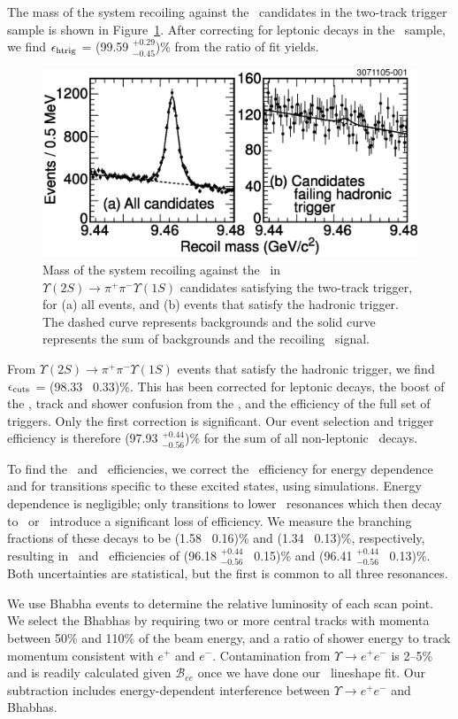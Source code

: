 \documentclass[aps,prd,preprint,superscriptaddress,tightenlines,nofootinbib]{revtex4}
\begin{document}
The mass of the system recoiling against the \pipi\ candidates in the
two-track trigger sample is shown in Figure~\ref{fig:cascades}.  After
correcting for leptonic decays in the \us\ sample, we find $\epsilon_{\mbox{\scriptsize htrig}}$ =
(99.59 $^{+0.29}_{-0.45}$)\% from the ratio of fit yields.

\begin{figure}
  \includegraphics[width=0.5\linewidth]{cascades}
  \caption{\label{fig:cascades} Mass of the system recoiling against
the \pipi\ in $\Upsilon(2S) \to \pi^+\pi^- \Upsilon(1S)$ candidates
satisfying the two-track trigger, for (a) all events, and (b) events
that satisfy the hadronic trigger.  The dashed curve represents
backgrounds and the solid curve represents the sum of backgrounds and
the recoiling \us\ signal.}
\end{figure}

From $\Upsilon(2S) \to \pi^+\pi^- \Upsilon(1S)$ events that satisfy
the hadronic trigger, we find $\epsilon_{\mbox{\scriptsize cuts}}$ = (98.33 \PM\ 0.33)\%.  This
has been corrected for leptonic decays, the boost of the \us, track
and shower confusion from the \pipi, and the efficiency of the full
set of triggers.  Only the first correction is significant.  Our event
selection and trigger efficiency is therefore (97.93
$^{+0.44}_{-0.56}$)\% for the sum of all non-leptonic \us\ decays.

To find the \uss\ and \usss\ efficiencies, we correct the \us\
efficiency for energy dependence and for transitions specific to these
excited states, using simulations.  Energy dependence is negligible;
only transitions to lower \ups\ resonances which then decay to \ee\ or
\mm\ introduce a significant loss of efficiency.  We measure the
branching fractions of these decays to be (1.58 \PM\ 0.16)\% and (1.34
\PM\ 0.13)\%, respectively, resulting in \uss\ and \usss\ efficiencies
of (96.18 $^{+0.44}_{-0.56}$ \PM\ 0.15)\% and (96.41
$^{+0.44}_{-0.56}$ \PM\ 0.13)\%.  Both uncertainties are statistical,
but the first is common to all three resonances.

We use Bhabha events to determine the relative luminosity of each scan
point.  We select the Bhabhas by requiring two or more central tracks
with momenta between 50\% and 110\% of the beam energy, and a ratio of
shower energy to track momentum consistent with $e^+$ and $e^-$.
Contamination from $\Upsilon \to e^+e^-$ is 2--5\% and is readily
calculated given ${\mathcal B}_{ee}$ once we have done our \ups\
lineshape fit.  Our subtraction includes energy-dependent interference
between $\Upsilon \to e^+e^-$ and Bhabhas.
\end{document}
